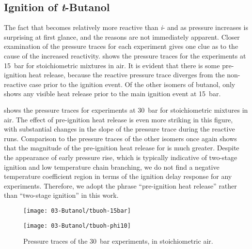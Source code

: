 \documentclass[../main.tex]{subfiles}
\begin{document}
\subsection{Ignition of \textit{t}-Butanol}
\label{sec:tbuoh-ignition}

The fact that \tBuOH{} becomes relatively more reactive than
\textit{i}- and \sBuOH{} as pressure increases is surprising at first
glance, and the reasons are not immediately apparent. Closer examination of the
pressure traces for each experiment gives one clue as to the cause of the
increased reactivity.  shows the pressure traces for
the \tBuOH{} experiments at \SI{15}{\bar} for stoichiometric mixtures in
air. It is evident that there is some pre-ignition heat release, because the
reactive pressure trace diverges from the non-reactive case prior to the
ignition event. Of the other isomers of butanol, only \nBuOH{} shows
any visible heat release prior to the main ignition event at \SI{15}{\bar}.

 shows the pressure traces for \tBuOH{}
experiments at \SI{30}{\bar} for stoichiometric mixtures in air. The effect of
pre-ignition heat release is even more striking in this figure, with
substantial changes in the slope of the pressure trace during the reactive
runs. Comparison to the pressure traces of the other isomers once again shows
that the magnitude of the pre-ignition heat release for \tBuOH{} is
much greater. Despite the appearance of early pressure rise, which is typically
indicative of two-stage ignition and low temperature chain branching, we do not
find a negative temperature coefficient region in terms of the ignition delay
response for any \tBuOH{} experiments. Therefore, we adopt the phrase
``pre-ignition heat release'' rather than ``two-stage ignition'' in this work.

\begin{figure}
    \begin{floatrow}
    \ffigbox
        {\texttt{[image: 03-Butanol/tbuoh-15bar]}}
        {\caption{Pressure traces of the \SI{15}{\bar} \tBuOH{} experiments,
            in stoichiometric air.}
        \label{fig:tbuoh-15bar}}
    \ffigbox
        {\texttt{[image: 03-Butanol/tbuoh-phi10]}}
        {\caption{Pressure traces of the \SI{30}{\bar} \tBuOH{} experiments,
            in stoichiometric air.}
        \label{fig:tbuoh-phi10}}
    \end{floatrow}
\end{figure}
\end{document}
